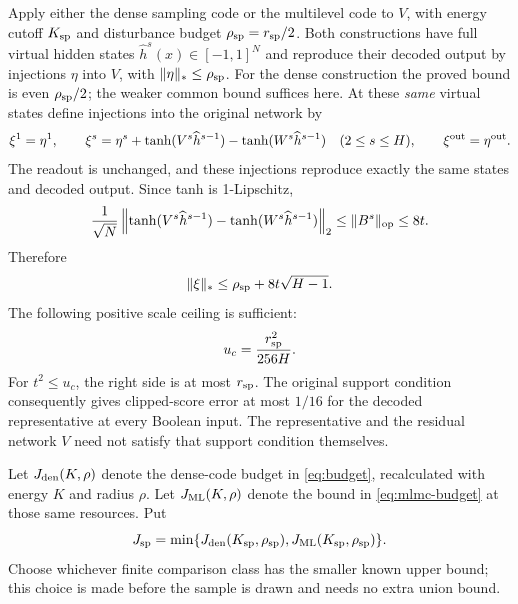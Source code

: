 Apply either the dense sampling code or the multilevel code to $V$,
with energy cutoff $K_{\rm sp}$ and disturbance budget
$\rho_{\rm sp}=r_{\rm sp}/2$. Both constructions have full virtual
hidden states $\widehat h^s(x)\in[-1,1]^N$ and reproduce their decoded
output by injections $\eta$ into $V$, with
$\|\eta\|_*\le\rho_{\rm sp}$.
For the dense construction the proved bound is even
$\rho_{\rm sp}/2$; the weaker common bound suffices here.
At these \emph{same} virtual states define injections into the original
network by
\[
 \xi^1=\eta^1,\qquad
 \xi^s=\eta^s+
   \tanh(V^s\widehat h^{s-1})-
   \tanh(W^s\widehat h^{s-1})\quad(2\le s\le H),
 \qquad \xi^{\rm out}=\eta^{\rm out}.
\]
The readout is unchanged, and these injections reproduce exactly the
same states and decoded output. Since tanh is 1-Lipschitz,
\[
 \frac1{\sqrt N}\left\|
 \tanh(V^s\widehat h^{s-1})-
 \tanh(W^s\widehat h^{s-1})\right\|_2
 \le\|B^s\|_{\rm op}\le8t.
\]
Therefore
\[
 \|\xi\|_*\le\rho_{\rm sp}+8t\sqrt{H-1}.
\]
The following positive scale ceiling is sufficient:
\begin{equation}\label{eq:spectral-cutoff}
 u_c=\frac{r_{\rm sp}^2}{256H}.
\end{equation}
For $t^2\le u_c$, the right side is at most $r_{\rm sp}$.
The original support condition consequently gives clipped-score error
at most $1/16$ for the decoded representative at every Boolean input.
The representative and the residual network $V$ need not satisfy that
support condition themselves.

Let $J_{\rm den}(K,\rho)$ denote the dense-code budget in
\eqref{eq:budget}, recalculated with energy $K$ and radius $\rho$.
Let $J_{\rm ML}(K,\rho)$ denote the bound in
\eqref{eq:mlmc-budget} at those same resources. Put
\begin{equation}\label{eq:spectral-code-budget}
 J_{\rm sp}=\min\{J_{\rm den}(K_{\rm sp},\rho_{\rm sp}),
                    J_{\rm ML}(K_{\rm sp},\rho_{\rm sp})\}.
\end{equation}
Choose whichever finite comparison class has the smaller known upper
bound; this choice is made before the sample is drawn and needs no
extra union bound.

